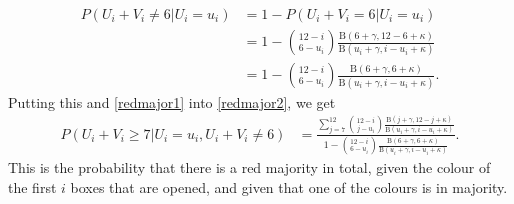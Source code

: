 \documentclass{article}
\begin{document}
\begin{equation*}
    \begin{aligned}
        P(U_i+V_i\neq6|U_i=u_i) 
        &= 1-P(U_i+V_i=6|U_i=u_i)\\[6pt]
        &= 1-\binom{12-i}{6-u_i} \frac{\text{B}(6+\gamma,12-6+\kappa)}{\text{B}(u_i+\gamma,i-u_i+\kappa)}\\[6pt]
        &= 1-\binom{12-i}{6-u_i} \frac{\text{B}(6+\gamma,6+\kappa)}{\text{B}(u_i+\gamma,i-u_i+\kappa)}.
    \end{aligned}
\end{equation*}
Putting this and \eqref{redmajor1} into \eqref{redmajor2}, we get
\begin{equation*}
\label{redmajor_final}
    \begin{aligned}
        P(U_i+V_i \geq 7 | U_i=u_i,U_i+V_i \neq 6) 
        &= \frac{\sum_{j=7}^{12} \binom{12-i}{j-u_i} \frac{\text{B}(j+\gamma,12-j+\kappa)}{\text{B}(u_i+\gamma,i-u_i+\kappa)}}{1-\binom{12-i}{6-u_i} \frac{\text{B}(6+\gamma,6+\kappa)}{\text{B}(u_i+\gamma,i-u_i+\kappa)}}.
    \end{aligned}
\end{equation*}
This is the probability that there is a red majority in total, given the colour of the first $i$ boxes that are opened, and given that one of the colours is in majority. 
\end{document}

